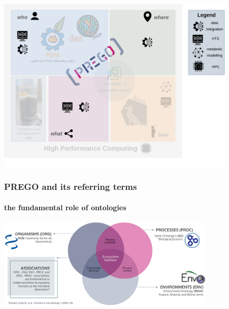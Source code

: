 \documentclass{beamer}
\begin{document}
   \begin{frame}
      \includegraphics[width=115mm]{resources/phd_graphical_abstract-prego.png}
   \end{frame}

   \begin{frame}
      \frametitle{PREGO and its referring terms}
      \framesubtitle{the fundamental role of ontologies}
      \includegraphics[width=105mm]{resources/prego_triple_associations.png}
   \end{frame}
\end{document}
